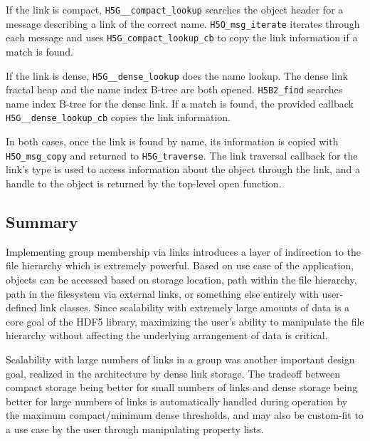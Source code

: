If the link is compact, \texttt{H5G\_\_compact\_lookup} searches the object header for a message describing a link of the correct name. \texttt{H5O\_msg\_iterate} iterates through each message and uses \texttt{H5G\_compact\_lookup\_cb} to copy the link information if a match is found.

If the link is dense, \texttt{H5G\_\_dense\_lookup} does the name lookup. The dense link fractal heap and the name index B-tree are both opened. \texttt{H5B2\_find} searches name index B-tree for the dense link. If a match is found, the provided callback \texttt{H5G\_\_dense\_lookup\_cb} copies the link information.

In both cases, once the link is found by name, its information is copied with \texttt{H5O\_msg\_copy} and returned to \texttt{H5G\_traverse}. The link traversal callback for the link's type is used to access information about the object through the link, and a handle to the object is returned by the top-level open function.

\subsection{Summary} Implementing group membership via links introduces a layer of indirection to the file hierarchy which is extremely powerful. Based on use case of the application, objects can be accessed based on storage location, path within the file hierarchy, path in the filesystem via external links, or something else entirely with user-defined link classes. Since scalability with extremely large amounts of data is a core goal of the HDF5 library, maximizing the user's ability to manipulate the file hierarchy without affecting the underlying arrangement of data is critical. 

Scalability with large numbers of links in a group was another important design goal, realized in the architecture by dense link storage. The tradeoff between compact storage being better for small numbers of links and dense storage being better for large numbers of links is automatically handled during operation by the maximum compact/minimum dense thresholds, and may also be custom-fit to a use case by the user through manipulating property lists.